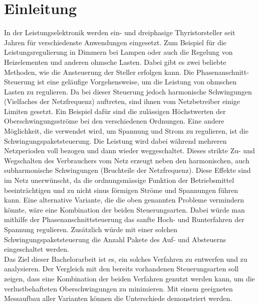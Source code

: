 \section{Einleitung}











In der Leistungselektronik werden ein- und dreiphasige Thyristorsteller seit Jahren für verschiedenste Anwendungen eingesetzt. Zum Beispiel für die Leistungsregulierung in Dimmern bei Lampen oder auch die Regelung von Heizelementen und anderen ohmsche Lasten. Dabei gibt es zwei beliebte Methoden, wie die Ansteuerung der Steller erfolgen kann. Die Phasenanschnitt-Steuerung ist eine geläufige Vorgehensweise, um die Leistung von ohmschen Lasten zu regulieren. Da bei dieser Steuerung jedoch harmonische Schwingungen (Vielfaches der Netzfrequenz) auftreten, sind ihnen vom Netzbetreiber einige Limiten gesetzt. Ein Beispiel dafür sind die zulässigen Höchstwerten der Oberschwingungsströme bei den verschiedenen Ordnungen. Eine andere Möglichkeit, die verwendet wird, um Spannung und Strom zu regulieren, ist die Schwingungspaketsteuerung. Die Leistung wird dabei während mehreren Netzperioden voll bezogen und dann wieder weggeschaltet. Dieses strikte Zu- und Wegschalten des Verbrauchers vom Netz erzeugt neben den harmonischen, auch subharmonische Schwingungen (Bruchteile der Netzfrequenz). Diese Effekte sind im Netz unerwünscht, da die ordnungsmässige Funktion der Betriebsmittel beeinträchtigen und zu nicht sinus förmigen Ströme und Spannungen führen kann.
Eine alternative Variante, die die oben genannten Probleme vermindern könnte, wäre eine Kombination der beiden Steuerungsarten. Dabei würde man mithilfe der Phasenanschnittsteuerung das sanfte Hoch- und Runterfahren der Spannung regulieren. Zusätzlich würde mit einer solchen Schwingungspaketsteuerung die Anzahl Pakete des Auf- und Absteuerns eingeschaltet werden.\\
Das Ziel dieser Bachelorarbeit ist es, ein solches Verfahren zu entwerfen und zu analysieren. Der Vergleich mit den bereits vorhandenen Steuerungsarten soll zeigen, dass eine Kombination der beiden Verfahren genutzt werden kann, um die verlustbehafteten Oberschwingungen zu minimieren. Mit einem geeigneten Messaufbau aller Varianten können die Unterschiede demonstriert werden.\\
